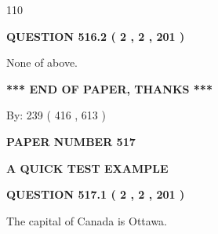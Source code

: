 \documentclass[12pt]{article}
\begin{document}
110
 
 
  
\vspace{0.2in}
  
{\textbf{\Large{QUESTION
516.2 
 ( 2 , 2 , 201 )
}}}
  
  
 
 
\noindent{}
 
 
 None of above.
 
 
 
 
   
   
 \vspace{0.2in}
 
   
   
   
   
\vspace{1.0in} 
{\textbf{\large{ *** END OF PAPER, THANKS *** }}} 
   
   
\hspace{1.0in} By: 
 239 ( 416 ,  613 )
   
   
   
   
\newpage 
\setcounter{page}{ 
   517001 } 
   
   
   
   
 {\textbf{ \Large{ PAPER NUMBER  517  }}}
   
   
\vspace{0.2in}
   
   
   
   
   
   
 \vspace{0.2in}
{\LARGE {\textbf{ A QUICK TEST EXAMPLE}}}
   
   
  
\vspace{0.2in}
  
{\textbf{\Large{QUESTION
517.1 
 ( 2 , 2 , 201 )
}}}
  
  
 
 
\noindent{}
 
 
The capital of Canada is Ottawa.
 
 
 
 
  
\vspace{0.2in}
  
\end{document}
